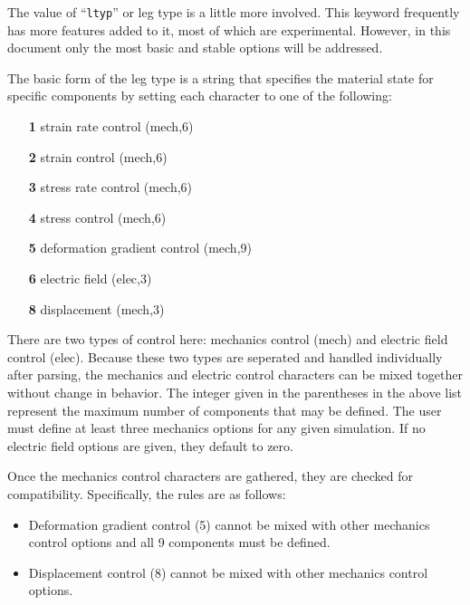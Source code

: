 \documentclass[11pt]{article}
\newcommand{\ltyp}{\texttt{ltyp}}
\begin{document}
The value of ``\ltyp{}'' or leg type is a little more involved. This keyword
frequently has more features added to it, most of which are experimental.
However, in this document only the most basic and stable options will be
addressed.

The basic form of the leg type is a string that specifies the material state for
specific components by setting each character to one of the following:

\begin{itemize}
  \setlength{\itemsep}{0pt}
  \setlength{\parskip}{0pt}
  \setlength{\parsep}{0pt}
  \item[\textbf{1}] strain rate control (mech,6)
  \item[\textbf{2}] strain control (mech,6)
  \item[\textbf{3}] stress rate control (mech,6)
  \item[\textbf{4}] stress control (mech,6)
  \item[\textbf{5}] deformation gradient control (mech,9)
  \item[\textbf{6}] electric field (elec,3)
  \item[\textbf{8}] displacement (mech,3)
\end{itemize}

There are two types of control here: mechanics control (mech) and electric field
control (elec). Because these two types are seperated and handled individually
after parsing, the mechanics and electric control characters can be mixed
together without change in behavior. The integer given in the parentheses in the
above list represent the maximum number of components that may be defined. The
user must define at least three mechanics options for any given simulation. If no
electric field options are given, they default to zero.

Once the mechanics control characters are gathered, they are checked for
compatibility. Specifically, the rules are as follows:

\begin{itemize}
  \item Deformation gradient control (5) cannot be mixed with other mechanics
  control options and all 9 components must be defined.
  \item Displacement control (8) cannot be mixed with other mechanics control
  options.
\end{itemize}
\end{document}
